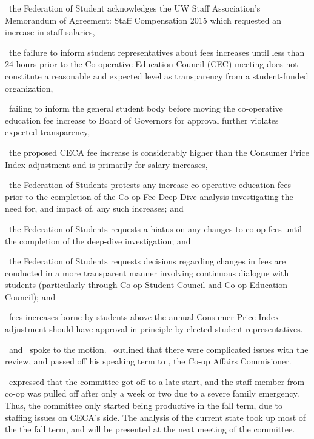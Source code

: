 \begin{motion}
    \whereas\ the Federation of Student acknowledges the UW Staff Association’s
    Memorandum of Agreement: Staff Compensation 2015 which requested an
    increase in staff salaries,

    \whereas\ the failure to inform student representatives about fees
    increases until less than 24 hours prior to the Co-operative Education
    Council (CEC) meeting does not constitute a reasonable and expected level
    as transparency from a student-funded organization,

    \whereas\ failing to inform the general student body before moving the
    co-operative education fee increase to Board of Governors for approval
    further violates expected transparency,

    \whereas\ the proposed CECA fee increase is considerably higher than the
    Consumer Price Index adjustment and is primarily for salary increases,

    \birt\ the Federation of Students protests any increase co-operative
    education fees prior to the completion of the Co-op Fee Deep-Dive analysis
    investigating the need for, and impact of, any such increases; and

    \bifrt\ the Federation of Students requests a hiatus on any changes to co-op
    fees until the completion of the deep-dive investigation; and 

    \bifrt\ the Federation of Students requests decisions regarding changes in
    fees are conducted in a more transparent manner involving continuous
    dialogue with students (particularly through Co-op Student Council and
    Co-op Education Council); and 

    \bifrt\ fees increases borne by students above the annual Consumer Price
    Index adjustment should have approval-in-principle by elected student
    representatives.   
    \movers{\seneca}{\andrewc}

    \seneca\ and \andrewc\ spoke to the motion. \andrewc\ outlined that there
    were complicated issues with the review, and passed off his speaking term
    to \hannah, the Co-op Affairs Commisioner. 

    \coopcom\ expressed that the committee got off to a late start, and the
    staff member from co-op was pulled off after only a week or two due to a
    severe family emergency. Thus, the committee only started being productive
    in the fall term, due to staffing issues on CECA's side. The analysis of
    the current state took up most of the the fall term, and will be presented
    at the next meeting of the committee.


\end{motion}
